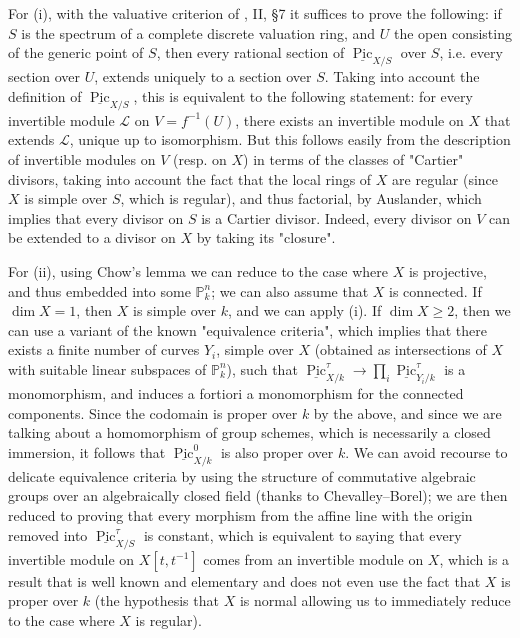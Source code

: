 \begin{cproof}
    For (i), with the valuative criterion of \cite{GD1960}, II, §7 it suffices to prove the following: if $S$ is the spectrum of a complete discrete valuation ring, and $U$ the open consisting of the generic point of $S$, then every rational section of $\underline{\operatorname{Pic}}_{X/S}$ over $S$, i.e. every section over $U$, extends uniquely to a section over $S$.
    Taking into account the definition of $\underline{\operatorname{Pic}}_{X/S}$, this is equivalent to the following statement: for every invertible module $\mathcal{L}$ on $V=f^{-1}(U)$, there exists an invertible module on $X$ that extends $\mathcal{L}$, unique up to isomorphism.
    But this follows easily from the description of invertible modules on $V$ (resp. on $X$) in terms of the classes of "Cartier" divisors, taking into account the fact that the local rings of $X$ are regular (since $X$ is simple over $S$, which is regular), and thus factorial, by Auslander, which implies that every divisor on $S$ is a Cartier divisor.
    Indeed, every divisor on $V$ can be extended to a divisor on $X$ by taking its "closure".

    For (ii), using Chow's lemma we can reduce to the case where $X$ is projective, and thus embedded into some $\mathbb{P}_k^n$;
    we can also assume that $X$ is connected.
    If $\dim X=1$, then $X$ is simple over $k$, and we can apply (i).
    If $\dim X\geqslant2$, then we can use a variant of the known "equivalence criteria", which implies that there exists a finite number of curves $Y_i$, simple over $X$ (obtained as intersections of $X$ with suitable linear subspaces of $\mathbb{P}_k^n$), such that $\underline{\operatorname{Pic}}_{X/k}^\tau\to\prod_i\underline{\operatorname{Pic}}_{Y_i/k}^\tau$ is a monomorphism, and induces a fortiori a monomorphism for the connected components.
    Since the codomain is proper over $k$ by the above, and since we are talking about a homomorphism of group schemes, which is necessarily a closed immersion, it follows that $\underline{\operatorname{Pic}}_{X/k}^0$ is also proper over $k$.
    We can avoid recourse to delicate equivalence criteria by using the structure of commutative algebraic groups over an algebraically closed field (thanks to Chevalley–Borel);
    we are then reduced to proving that every morphism from the affine line with the origin removed into $\underline{\operatorname{Pic}}_{X/S}^\tau$ is constant, which is equivalent to saying that every invertible module on $X[t,t^{-1}]$ comes from an invertible module on $X$, which is a result that is well known and elementary and does not even use the fact that $X$ is proper over $k$ (the hypothesis that $X$ is normal allowing us to immediately reduce to the case where $X$ is regular).
\end{cproof}

